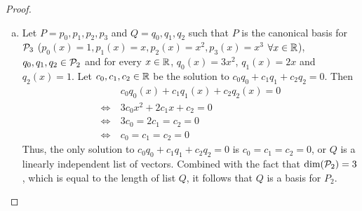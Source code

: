 \begin{proof}
    \renewcommand{\qedsymbol}{$\blacksquare$}
    \begin{enumerate}[(a)]
    \item
    Let $P=p_0,p_1,p_2,p_3$ and $Q=q_0,q_1,q_2$ such that $P$ is the canonical basis for $\P_3$ ($p_0(x)=1, p_1(x)=x, p_2(x)=x^2, p_3(x)=x^3$ $\forall x\in\R$), $q_0,q_1,q_2\in\P_2$ and for every $x\in\R$, $q_0(x)=3x^2$, $q_1(x)=2x$ and $q_2(x)=1$.
    Let $c_0,c_1,c_2\in\R$ be the solution to $c_0q_0+c_1q_1+c_2q_2=0$.
    Then 
    \[
        \begin{aligned}
            &c_0q_0(x)+c_1q_1(x)+c_2q_2(x)=0\\
            \Leftrightarrow\
            &3c_0x^2+2c_1x+c_2=0\\
            \Leftrightarrow\
            &3c_0=2c_1=c_2=0\\
            \Leftrightarrow\
            &c_0=c_1=c_2=0
        \end{aligned}
    \]
    Thus, the only solution to $c_0q_0+c_1q_1+c_2q_2=0$ is $c_0=c_1=c_2=0$, or $Q$ is a linearly independent list of vectors.
    Combined with the fact that $\dim(\P_2)=3$, which is equal to the length of list $Q$, it follows that $Q$ is a basis for $P_2$.


\end{enumerate}
\end{proof}
